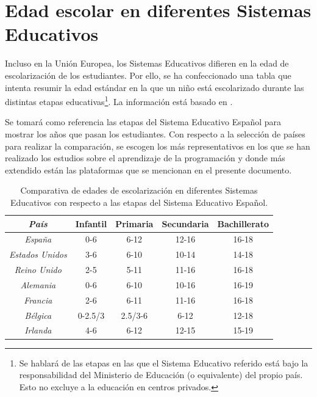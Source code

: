 
\appendix

\chapter{Edad escolar en diferentes Sistemas Educativos}\label{anexo:edad-educacion}

Incluso en la Unión Europea, los Sistemas Educativos difieren en la edad de escolarización de los estudiantes. Por ello, se ha confeccionado una tabla que intenta resumir la edad estándar en la que un niño está escolarizado durante las distintas etapas educativas\footnote{Se hablará de las etapas en las que el Sistema Educativo referido está bajo la responsabilidad del Ministerio de Educación (o equivalente) del propio país. Esto no excluye a la educación en centros privados.}. La información está basado en \cite{cursos-educacion-europa}.

Se tomará como referencia las etapas del Sistema Educativo Español para mostrar los años que pasan los estudiantes. Con respecto a la selección de países para realizar la comparación, se escogen los más representativos en los que se han realizado los estudios sobre el aprendizaje de la programación y donde más extendido están las plataformas que se mencionan en el presente documento. 


\begin{table}[!ht]
	\begin{centering}
		\begin{tabular}{c|c|c|c|c}
\emph{País} & Infantil & Primaria & Secundaria & Bachillerato\\
\hline
\emph{España} & 0-6 & 6-12 & 12-16 & 16-18\\
\emph{Estados Unidos} & 3-6 & 6-10 & 10-14 & 14-18\\
\emph{Reino Unido} & 2-5 & 5-11 & 11-16 & 16-18\\
\emph{Alemania} & 0-6 & 6-10 & 10-16 & 16-19\\
\emph{Francia} & 2-6 & 6-11 & 11-16 & 16-18\\
\emph{Bélgica} & 0-2.5/3 & 2.5/3-6 & 6-12 & 12-18\\
\emph{Irlanda} & 4-6 & 6-12 & 12-15 & 15-19\\
\end{tabular}
	\caption{Comparativa de edades de escolarización en diferentes Sistemas Educativos con respecto a las etapas del Sistema Educativo Español.}
		\label{tab:comparativa-tecnicas}
	\end{centering}
\end{table}

